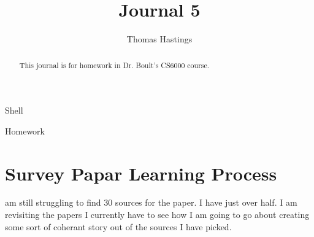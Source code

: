 \documentclass[journal]{IEEEtran}
\begin{document}
  \title{Journal 5}
  \author{Thomas Hastings}%
  
  {Shell}
  \maketitle
  
  \begin{abstract}
  This journal is for homework in Dr. Boult's CS6000 course.
  \end{abstract}
  
  \begin{IEEEkeywords}
  Homework
  \end{IEEEkeywords}
  
  
  \section{Survey Papar Learning Process}
   am still struggling to find 30 sources for the paper. I have just over half. I am revisiting the papers I currently have to see how I am going to go about creating some sort of coherant story out of the sources I have picked.
  
  
  
\end{document}
